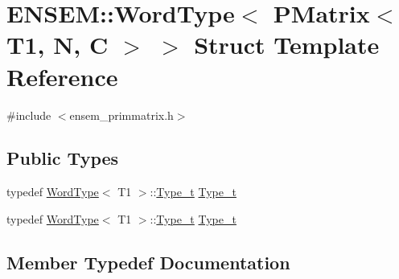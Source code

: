 \hypertarget{structENSEM_1_1WordType_3_01PMatrix_3_01T1_00_01N_00_01C_01_4_01_4}{}\section{E\+N\+S\+EM\+:\+:Word\+Type$<$ P\+Matrix$<$ T1, N, C $>$ $>$ Struct Template Reference}
\label{structENSEM_1_1WordType_3_01PMatrix_3_01T1_00_01N_00_01C_01_4_01_4}


{\ttfamily \#include $<$ensem\+\_\+primmatrix.\+h$>$}

\subsection*{Public Types}
\begin{DoxyCompactItemize}
\item 
typedef \mbox{\hyperlink{structENSEM_1_1WordType}{Word\+Type}}$<$ T1 $>$\+::\mbox{\hyperlink{structENSEM_1_1WordType_3_01PMatrix_3_01T1_00_01N_00_01C_01_4_01_4_a892bcf86195d7872e78b5a8b6a1e1734}{Type\+\_\+t}} \mbox{\hyperlink{structENSEM_1_1WordType_3_01PMatrix_3_01T1_00_01N_00_01C_01_4_01_4_a892bcf86195d7872e78b5a8b6a1e1734}{Type\+\_\+t}}
\item 
typedef \mbox{\hyperlink{structENSEM_1_1WordType}{Word\+Type}}$<$ T1 $>$\+::\mbox{\hyperlink{structENSEM_1_1WordType_3_01PMatrix_3_01T1_00_01N_00_01C_01_4_01_4_a892bcf86195d7872e78b5a8b6a1e1734}{Type\+\_\+t}} \mbox{\hyperlink{structENSEM_1_1WordType_3_01PMatrix_3_01T1_00_01N_00_01C_01_4_01_4_a892bcf86195d7872e78b5a8b6a1e1734}{Type\+\_\+t}}
\end{DoxyCompactItemize}


\subsection{Member Typedef Documentation}
\mbox{\label{structENSEM_1_1WordType_3_01PMatrix_3_01T1_00_01N_00_01C_01_4_01_4_a892bcf86195d7872e78b5a8b6a1e1734}} 
